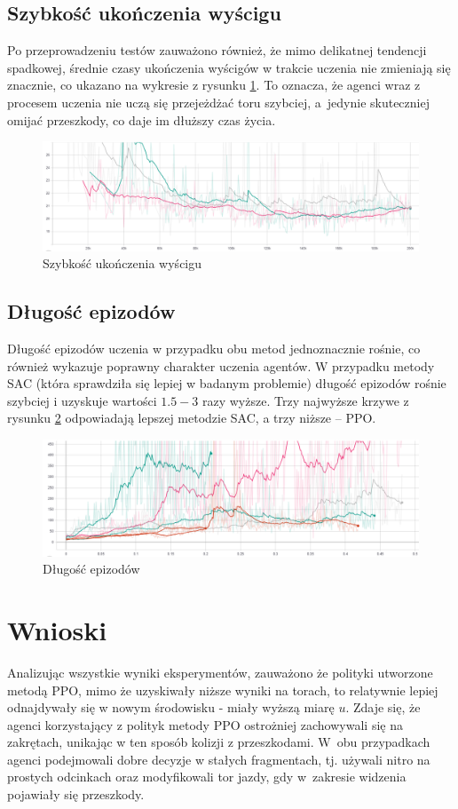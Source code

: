 \documentclass[a4paper,12pt]{article}
\let\oldsection\section
\renewcommand\section{\clearpage\oldsection}
\begin{document}
\subsection{Szybkość ukończenia wyścigu}
Po przeprowadzeniu testów zauważono również, że mimo delikatnej tendencji spadkowej, średnie czasy ukończenia wyścigów w trakcie uczenia nie zmieniają się znacznie, co ukazano na wykresie z rysunku \ref{pic:szybkosc}. To oznacza, że agenci wraz z procesem uczenia nie uczą się przejeżdżać toru szybciej, a~jedynie skuteczniej omijać przeszkody, co daje im dłuższy czas życia.
\begin{figure}[H]
	\centering
	\includegraphics[width=\textwidth]{szybkosc}
	\caption{Szybkość ukończenia wyścigu}
	\label{pic:szybkosc}
\end{figure}

\subsection{Długość epizodów}
Długość epizodów uczenia w przypadku obu metod jednoznacznie rośnie, co również wykazuje poprawny charakter uczenia agentów. W przypadku metody SAC (która sprawdziła się lepiej w badanym problemie) długość epizodów rośnie szybciej i uzyskuje wartości $1.5-3$ razy wyższe. Trzy najwyższe krzywe z rysunku \ref{pic:length} odpowiadają lepszej metodzie SAC, a trzy niższe -- PPO.
\begin{figure}[H]
	\centering
	\includegraphics[width=\textwidth]{episode_length}
	\caption{Długość epizodów}
	\label{pic:length}
\end{figure}


\section{Wnioski}
Analizując wszystkie wyniki eksperymentów, zauważono że polityki utworzone metodą PPO, mimo że uzyskiwały niższe wyniki na torach, to relatywnie lepiej odnajdywały się w nowym środowisku - miały wyższą miarę $u$. Zdaje się, że agenci korzystający z polityk metody PPO ostrożniej zachowywali się na zakrętach, unikając w ten sposób kolizji z przeszkodami. W~obu przypadkach agenci podejmowali dobre decyzje w stałych fragmentach, tj. używali nitro na prostych odcinkach oraz modyfikowali tor jazdy, gdy w~zakresie widzenia pojawiały się przeszkody.
\end{document}
